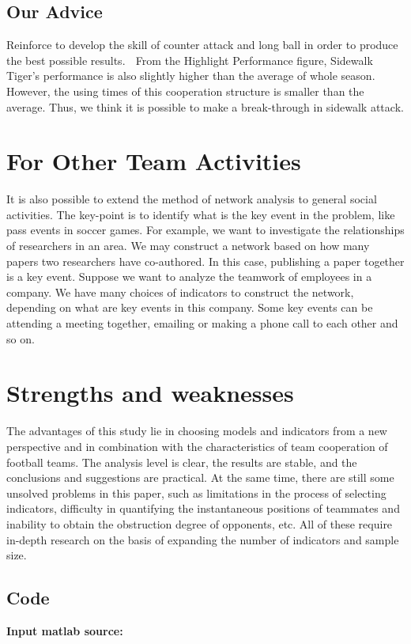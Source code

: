 \documentclass{mcmthesis}
\begin{document}
\subsection{Our Advice}
Reinforce to develop the skill of
counter attack and long ball in order
to produce the best possible results.
 From the Highlight Performance
figure, Sidewalk Tiger’s
performance is also slightly higher
than the average of whole season.
However, the using times of this
cooperation structure is smaller than
the average. Thus, we think it is
possible to make a break-through in
sidewalk attack.

\section{For Other Team Activities}
It is also possible to extend the method of network analysis to general social activities.
The key-point is to identify what is the key event in the problem, like pass events
in soccer games. For example, we want to investigate the relationships of researchers
in an area. We may construct a network based on how many papers two researchers
have co-authored. In this case, publishing a paper together is a key event. Suppose we
want to analyze the teamwork of employees in a company. We have many choices of
indicators to construct the network, depending on what are key events in this company.
Some key events can be attending a meeting together, emailing or making a phone call
to each other and so on.

\section{Strengths and weaknesses}
The advantages of this study lie in choosing models and indicators from a new
perspective and in combination with the characteristics of team cooperation of
football teams. The analysis level is clear, the results are stable, and the conclusions
and suggestions are practical. At the same time, there are still some unsolved
problems in this paper, such as limitations in the process of selecting indicators,
difficulty in quantifying the instantaneous positions of teammates and inability to
obtain the obstruction degree of opponents, etc. All of these require in-depth research
on the basis of expanding the number of indicators and sample size.

\newpage




\begin{appendices}
        \section{Code}
        \textbf{\textcolor[rgb]{0.98,0.00,0.00}{Input matlab source:}}
        
\end{appendices}
\end{document}
